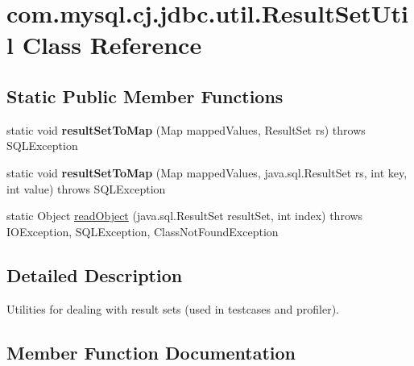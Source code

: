 \hypertarget{classcom_1_1mysql_1_1cj_1_1jdbc_1_1util_1_1_result_set_util}{}\section{com.\+mysql.\+cj.\+jdbc.\+util.\+Result\+Set\+Util Class Reference}
\label{classcom_1_1mysql_1_1cj_1_1jdbc_1_1util_1_1_result_set_util}
\subsection*{Static Public Member Functions}
\begin{DoxyCompactItemize}
\item 
\mbox{\label{classcom_1_1mysql_1_1cj_1_1jdbc_1_1util_1_1_result_set_util_acf321bd5feb37655a8377104b780f5d8}} 
static void {\bfseries result\+Set\+To\+Map} (Map mapped\+Values, Result\+Set rs)  throws S\+Q\+L\+Exception 
\item 
\mbox{\label{classcom_1_1mysql_1_1cj_1_1jdbc_1_1util_1_1_result_set_util_a34585de68e6f5962152ed491eea9c1da}} 
static void {\bfseries result\+Set\+To\+Map} (Map mapped\+Values, java.\+sql.\+Result\+Set rs, int key, int value)  throws S\+Q\+L\+Exception 
\item 
static Object \mbox{\hyperlink{classcom_1_1mysql_1_1cj_1_1jdbc_1_1util_1_1_result_set_util_a58cf5ba50434d76820d07ad65ce054eb}{read\+Object}} (java.\+sql.\+Result\+Set result\+Set, int index)  throws I\+O\+Exception, S\+Q\+L\+Exception, Class\+Not\+Found\+Exception 
\end{DoxyCompactItemize}


\subsection{Detailed Description}
Utilities for dealing with result sets (used in testcases and profiler). 

\subsection{Member Function Documentation}
\mbox{\label{classcom_1_1mysql_1_1cj_1_1jdbc_1_1util_1_1_result_set_util_a58cf5ba50434d76820d07ad65ce054eb}} 
